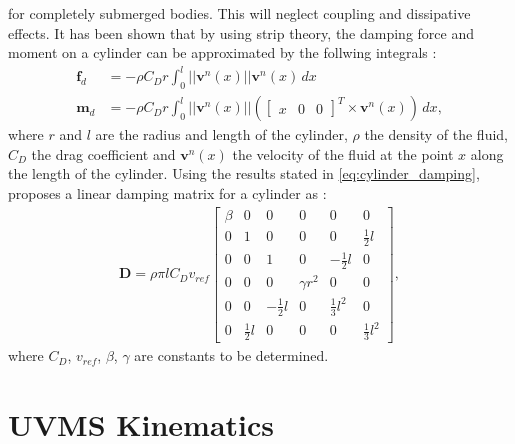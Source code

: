 for completely submerged bodies. This will neglect coupling and dissipative effects.
It has been shown that by using strip theory, the damping force and
moment on a cylinder can be approximated by the follwing integrals \cite{mcmillan1995}:
\begin{subequations}
    \label{eq:cylinder_damping}
    \begin{align}
        \bm{f}_d &= - \rho C_D r \int_{0}^{l} ||\bm{v}^n(x)|| \bm{v}^n(x) \,dx \\
        \bm{m}_d &= - \rho C_D r \int_{0}^{l} ||\bm{v}^n(x)||
        \left(\begin{bmatrix}x & 0 & 0\end{bmatrix}^T \times \bm{v}^n(x)\right) \,dx,
    \end{align}
\end{subequations}
where $r$ and $l$ are the radius and length of the cylinder, $\rho$ the density
of the fluid, $C_D$ the drag coefficient and $\bm{v}^n(x)$ the velocity of the
fluid at the point $x$ along the length of the cylinder. Using the results stated
in \autoref{eq:cylinder_damping}, \citeauthor{schmidt2018} proposes a linear
damping matrix for a cylinder as \cite{schmidt2018}:
\begin{align}
    \bm{D} = \rho \pi l C_D v_{ref}
    \begin{bmatrix}
        \beta &            0 &             0 &          0 &              0 &            0 \\
            0 &            1 &             0 &          0 &              0 & \frac{1}{2}l \\
            0 &            0 &             1 &          0 &  -\frac{1}{2}l &            0 \\
            0 &            0 &             0 & \gamma r^2 &              0 &            0 \\
            0 &            0 & -\frac{1}{2}l &          0 & \frac{1}{3}l^2 &            0 \\
            0 & \frac{1}{2}l &             0 &          0 &              0 & \frac{1}{3}l^2
    \end{bmatrix},
\label{eq:damping_cyl}
\end{align}
where $C_D$, $v_{ref}$, $\beta$, $\gamma$ are constants to be determined.

\iffalse
\section{UVMS Kinematics}

